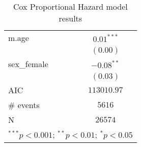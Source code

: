 \documentclass[12pt,letterpaper]{article}
\begin{document}
		\begin{table}[h!]
		\caption{\footnotesize Cox Proportional Hazard model results}
		\vspace{.25cm}
		\label{table:coefficients}
		\centering
		\begin{adjustbox}{width=.3\textwidth}
			\begin{tabular}{l c}
				\hline
			m.age       & $0.01^{***}$ \\
            & $(0.00)$     \\
sex\_female   & $-0.08^{**}$ \\
            & $(0.03)$     \\
\hline
AIC         & $113010.97$ \\
\# events & $5616$     \\
N   & $26574$    \\

				\hline
				\multicolumn{2}{l}{\footnotesize{$^{***}p<0.001$; $^{**}p<0.01$; $^{*}p<0.05$}}
			\end{tabular}
		\end{adjustbox}
	\end{table}
	
%	
%		
\end{document}
